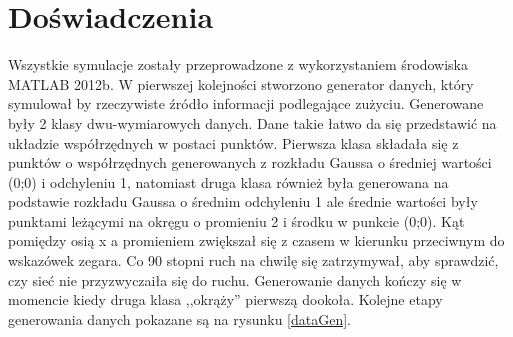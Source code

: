 \documentclass[10pt,a4paper]{article}
\begin{document}
\section{Doświadczenia}
Wszystkie symulacje zostały przeprowadzone z wykorzystaniem środowiska MATLAB 2012b. W pierwszej kolejności stworzono generator danych, który symulował by rzeczywiste źródło informacji podlegające zużyciu. Generowane były 2 klasy dwu-wymiarowych danych. Dane takie łatwo da się przedstawić na układzie współrzędnych w postaci punktów. Pierwsza klasa składała się z punktów o współrzędnych generowanych z rozkładu Gaussa o średniej wartości (0;0) i odchyleniu 1, natomiast druga klasa również była generowana na podstawie rozkładu Gaussa o średnim odchyleniu 1 ale średnie wartości były punktami leżącymi na okręgu o promieniu 2 i środku w punkcie (0;0). Kąt pomiędzy osią x a promieniem zwiększał się z czasem w kierunku przeciwnym do wskazówek zegara. Co 90 stopni ruch na chwilę się zatrzymywał, aby sprawdzić, czy sieć nie przyzwyczaiła się do ruchu. Generowanie danych kończy się w momencie kiedy druga klasa ,,okrąży'' pierwszą dookoła. Kolejne etapy generowania danych pokazane są na rysunku \ref{dataGen}. 
\end{document}
